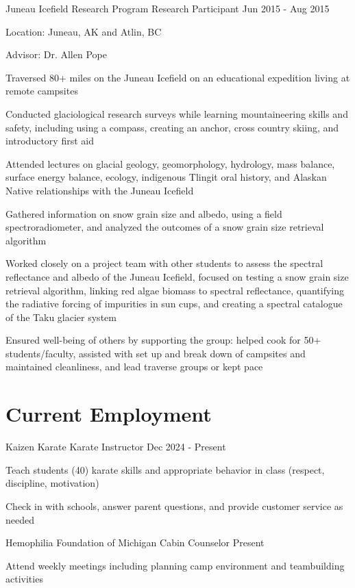 \documentclass{../styles/cv}
\begin{document}
\subsectionpositiondate
    {Juneau Icefield Research Program}
    {Research Participant}
    {Jun 2015 - Aug 2015}
\resumesublistbegin
    \item Location: Juneau, AK and Atlin, BC
    \item Advisor: Dr. Allen Pope
    \item Traversed 80+ miles on the Juneau Icefield on an educational expedition living at remote campsites
    \item Conducted glaciological research surveys while learning mountaineering skills and safety, including using a compass, creating an anchor, cross country skiing, and introductory first aid
    \item Attended lectures on glacial geology, geomorphology, hydrology, mass balance, surface energy balance, ecology, indigenous Tlingit oral history, and Alaskan Native relationships with the Juneau Icefield
    \item Gathered information on snow grain size and albedo, using a field spectroradiometer, and analyzed the outcomes of a snow grain size retrieval algorithm
    \item Worked closely on a project team with other students to assess the spectral reflectance and albedo of the Juneau Icefield, focused on testing a snow grain size retrieval algorithm, linking red algae biomass to spectral reflectance, quantifying the radiative forcing of impurities in sun cups, and creating a spectral catalogue of the Taku glacier system
    \item Ensured well-being of others by supporting the group: helped cook for 50+ students/faculty, assisted with set up and break down of campsites and maintained cleanliness, and lead traverse groups or kept pace
\resumesublistend

\section{Current Employment}

\subsectionpositiondate
    {Kaizen Karate}
    {Karate Instructor}
    {Dec 2024 - Present}
\resumesublistbegin
    \item Teach students (40) karate skills and appropriate behavior in class (respect, discipline, motivation)
    \item Check in with schools, answer parent questions, and provide customer service as needed
\resumesublistend

\subsectionpositiondate
    {Hemophilia Foundation of Michigan}
    {Cabin Counselor}
    {Present}
\resumesublistbegin
    \item Attend weekly meetings including planning camp environment and teambuilding activities
\resumesublistend
\end{document}
